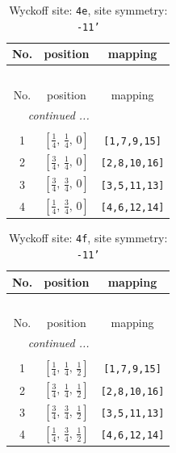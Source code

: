 \documentclass[fleqn,8pt]{jsarticle}
\begin{document}
\begin{longtable}{ccc}
\caption{Wyckoff site: {\tt 4e}, site symmetry: {\tt -11'}}
 \\
 \hline \hline
No. & position & mapping \\ \hline \endfirsthead

\multicolumn{2}{l}{\tablename\ \thetable{}} \\
 \hline \hline
No. & position & mapping \\ \hline \endhead

 \hline \hline
\multicolumn{2}{r}{\footnotesize\it continued ...} \\ \endfoot

 \hline \hline
\multicolumn{2}{r}{} \\ \endlastfoot

1 & $\left[ \frac{1}{4},\, \frac{1}{4},\, 0 \right]$ & {\tt [1,7,9,15]} \\ \hline
2 & $\left[ \frac{3}{4},\, \frac{1}{4},\, 0 \right]$ & {\tt [2,8,10,16]} \\ \hline
3 & $\left[ \frac{3}{4},\, \frac{3}{4},\, 0 \right]$ & {\tt [3,5,11,13]} \\ \hline
4 & $\left[ \frac{1}{4},\, \frac{3}{4},\, 0 \right]$ & {\tt [4,6,12,14]} \\
\end{longtable}
\renewcommand{\arraystretch}{1.2}
\begin{longtable}{ccc}
\caption{Wyckoff site: {\tt 4f}, site symmetry: {\tt -11'}}
 \\
 \hline \hline
No. & position & mapping \\ \hline \endfirsthead

\multicolumn{2}{l}{\tablename\ \thetable{}} \\
 \hline \hline
No. & position & mapping \\ \hline \endhead

 \hline \hline
\multicolumn{2}{r}{\footnotesize\it continued ...} \\ \endfoot

 \hline \hline
\multicolumn{2}{r}{} \\ \endlastfoot

1 & $\left[ \frac{1}{4},\, \frac{1}{4},\, \frac{1}{2} \right]$ & {\tt [1,7,9,15]} \\ \hline
2 & $\left[ \frac{3}{4},\, \frac{1}{4},\, \frac{1}{2} \right]$ & {\tt [2,8,10,16]} \\ \hline
3 & $\left[ \frac{3}{4},\, \frac{3}{4},\, \frac{1}{2} \right]$ & {\tt [3,5,11,13]} \\ \hline
4 & $\left[ \frac{1}{4},\, \frac{3}{4},\, \frac{1}{2} \right]$ & {\tt [4,6,12,14]} \\
\end{longtable}
\end{document}
